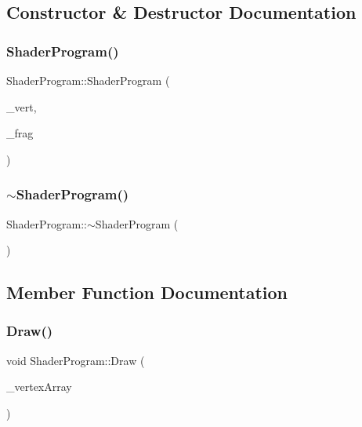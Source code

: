 \subsection{Constructor \& Destructor Documentation}
\mbox{\label{class_shader_program_a835418de83ffd318d244286f9b1786d1}} 
\subsubsection{\texorpdfstring{Shader\+Program()}{ShaderProgram()}}
{\footnotesize\ttfamily Shader\+Program\+::\+Shader\+Program (\begin{DoxyParamCaption}\item[{std\+::string}]{\+\_\+vert,  }\item[{std\+::string}]{\+\_\+frag }\end{DoxyParamCaption})}

\mbox{\label{class_shader_program_a2d2eadcfc48cc2e2ddb82aba70553a9f}} 
\subsubsection{\texorpdfstring{$\sim$\+Shader\+Program()}{~ShaderProgram()}}
{\footnotesize\ttfamily Shader\+Program\+::$\sim$\+Shader\+Program (\begin{DoxyParamCaption}{ }\end{DoxyParamCaption})}



\subsection{Member Function Documentation}
\mbox{\label{class_shader_program_aca655dd6fd3034c99d01b7627789087f}} 
\subsubsection{\texorpdfstring{Draw()}{Draw()}}
{\footnotesize\ttfamily void Shader\+Program\+::\+Draw (\begin{DoxyParamCaption}\item[{\mbox{\hyperlink{class_vertex_array}{Vertex\+Array}} \&}]{\+\_\+vertex\+Array }\end{DoxyParamCaption})}

